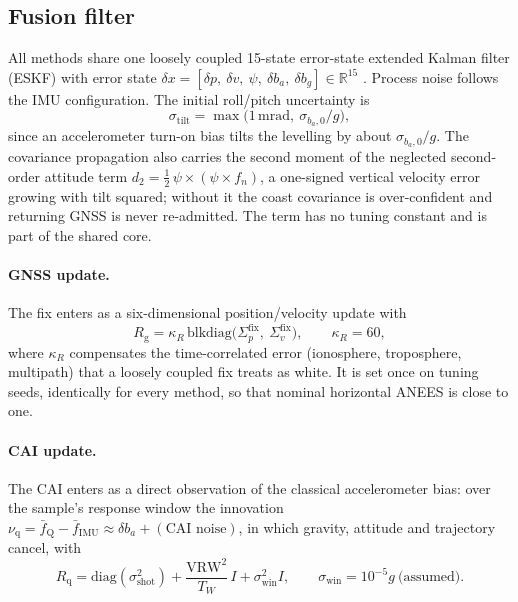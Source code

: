\documentclass[12pt,a4paper]{article}
\begin{document}
\subsection{Fusion filter}
\label{sec:fusion}
All methods share one loosely coupled 15-state error-state extended Kalman filter (ESKF) with error state $\delta x = [\delta p,\ \delta v,\ \psi,\ \delta b_a,\ \delta b_g]\in\mathbb R^{15}$ \cite{sola2017quaternion}. Process noise follows the IMU configuration. The initial roll/pitch uncertainty is
\begin{equation}
\sigma_{\mathrm{tilt}} = \max\!\big(1\,\mathrm{mrad},\ \sigma_{b_a,0}/g\big),
\label{eq:tilt0}
\end{equation}
since an accelerometer turn-on bias tilts the levelling by about $\sigma_{b_a,0}/g$. The covariance propagation also carries the second moment of the neglected second-order attitude term $d_2 = \tfrac12\,\psi\times(\psi\times f_n)$, a one-signed vertical velocity error growing with tilt squared; without it the coast covariance is over-confident and returning GNSS is never re-admitted. The term has no tuning constant and is part of the shared core.

\paragraph{GNSS update.}
The fix enters as a six-dimensional position/velocity update with
\begin{equation}
R_{\mathrm{g}} = \kappa_R\,\mathrm{blkdiag}\big(\Sigma_{p}^{\mathrm{fix}},\ \Sigma_{v}^{\mathrm{fix}}\big),\qquad \kappa_R = 60,
\label{eq:rgnss}
\end{equation}
where $\kappa_R$ compensates the time-correlated error (ionosphere, troposphere, multipath) that a loosely coupled fix treats as white. It is set once on tuning seeds, identically for every method, so that nominal horizontal ANEES is close to one.

\paragraph{CAI update.}
The CAI enters as a direct observation of the classical accelerometer bias: over the sample's response window the innovation $\nu_{\mathrm{q}} = \bar f_{\mathrm{Q}} - \bar f_{\mathrm{IMU}}\approx \delta b_a + (\text{CAI noise})$, in which gravity, attitude and trajectory cancel, with
\begin{equation}
R_{\mathrm{q}} = \mathrm{diag}(\sigma_{\mathrm{shot}}^2) + \frac{\mathrm{VRW}^2}{T_W}\,I + \sigma_{\mathrm{win}}^2 I,\qquad \sigma_{\mathrm{win}}=10^{-5}g\ \text{(assumed)}.
\label{eq:rq}
\end{equation}
\end{document}
